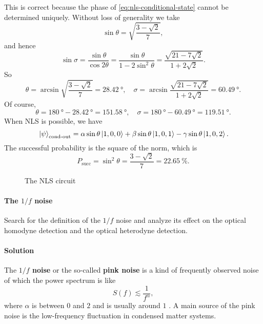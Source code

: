 \documentclass[hyperref, a4paper]{article}
\newcommand*{\concept}[1]{{\textbf{#1}}}
\begin{document}
\begin{itemize}
    This is correct because the phase of \eqref{eq:nls-conditional-state} cannot be determined uniquely.
    Without loss of generality we take 
    \[
        \sin \theta = \sqrt{\frac{3 - \sqrt{2}}{7}},
    \]
    and hence 
    \[
        \sin \sigma = \frac{\sin \theta}{\cos 2 \theta} = \frac{\sin \theta}{1 - 2 \sin^2 \theta} = \frac{\sqrt{21 - 7 \sqrt{2}}}{1 + 2 \sqrt{2}}.
    \]
    So 
    \begin{equation}
        \theta = \arcsin \sqrt{\frac{3 - \sqrt{2}}{7}} = \SI{28.42}{\degree}, \quad \sigma = \arcsin \frac{\sqrt{21 - 7 \sqrt{2}}}{1 + 2 \sqrt{2}} = \SI{60.49}{\degree}.
    \end{equation}
    Of course, 
    \begin{equation}
        \theta = \SI{180}{\degree} - \SI{28.42}{\degree} = \SI{151.58}{\degree}, \quad \sigma = \SI{180}{\degree} - \SI{60.49}{\degree} = \SI{119.51}{\degree}.
    \end{equation}
    When NLS is possible, we have 
    \[
        \ket*{\psi}_\text{cond-out} = \alpha \sin \theta \ket*{1, 0, 0} + \beta \sin \theta \ket*{1, 0, 1} - \gamma \sin \theta \ket*{1, 0, 2}.
    \]
    The successful probability is the square of the norm, which is 
    \begin{equation}
        P_\text{succ} = \sin^2 \theta = \frac{3 - \sqrt{2}}{7} = \SI{22.65}{\percent}.
    \end{equation}
\end{itemize}

\begin{figure}
    \centering
    
    \caption{The NLS circuit}
    \label{fig:nls}
\end{figure}

\paragraph{}

\paragraph{The $1/f$ noise} Search for the definition of the $1/f$ noise and analyze its effect on the optical homodyne detection and the optical heterodyne detection.

\paragraph{Solution} The \concept{$1/f$ noise} or the so-called \concept{pink noise} is a kind of frequently observed noise of which the power spectrum is like
\[
    S(f) \lesssim \frac{1}{f^\alpha}, 
\]
where $\alpha$ is between $0$ and $2$ and is usually around $1$ \cite{PinknoiseWikipedia}.
A main source of the pink noise is the low-frequency fluctuation in condensed matter systems.
\end{document}

